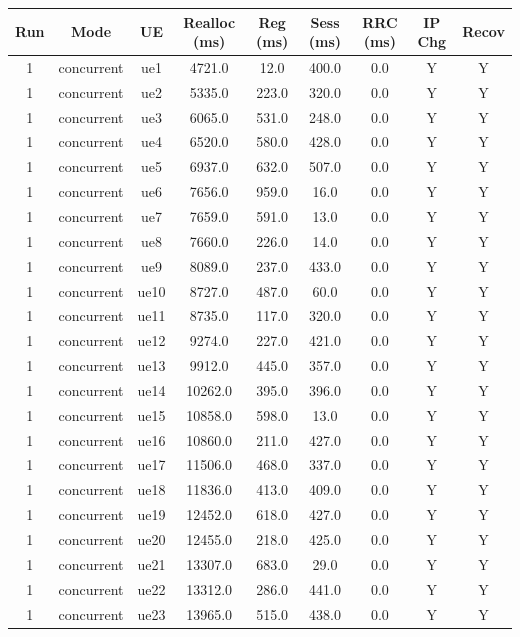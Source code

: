 \begin{table}[ht]
\centering
\begin{tabular}{|c|c|c|c|c|c|c|c|c|}
\hline
Run & Mode & UE & Realloc (ms) & Reg (ms) & Sess (ms) & RRC (ms) & IP Chg & Recov \\
\hline
1 & concurrent & ue1 & 4721.0 & 12.0 & 400.0 & 0.0 & Y & Y \\
1 & concurrent & ue2 & 5335.0 & 223.0 & 320.0 & 0.0 & Y & Y \\
1 & concurrent & ue3 & 6065.0 & 531.0 & 248.0 & 0.0 & Y & Y \\
1 & concurrent & ue4 & 6520.0 & 580.0 & 428.0 & 0.0 & Y & Y \\
1 & concurrent & ue5 & 6937.0 & 632.0 & 507.0 & 0.0 & Y & Y \\
1 & concurrent & ue6 & 7656.0 & 959.0 & 16.0 & 0.0 & Y & Y \\
1 & concurrent & ue7 & 7659.0 & 591.0 & 13.0 & 0.0 & Y & Y \\
1 & concurrent & ue8 & 7660.0 & 226.0 & 14.0 & 0.0 & Y & Y \\
1 & concurrent & ue9 & 8089.0 & 237.0 & 433.0 & 0.0 & Y & Y \\
1 & concurrent & ue10 & 8727.0 & 487.0 & 60.0 & 0.0 & Y & Y \\
1 & concurrent & ue11 & 8735.0 & 117.0 & 320.0 & 0.0 & Y & Y \\
1 & concurrent & ue12 & 9274.0 & 227.0 & 421.0 & 0.0 & Y & Y \\
1 & concurrent & ue13 & 9912.0 & 445.0 & 357.0 & 0.0 & Y & Y \\
1 & concurrent & ue14 & 10262.0 & 395.0 & 396.0 & 0.0 & Y & Y \\
1 & concurrent & ue15 & 10858.0 & 598.0 & 13.0 & 0.0 & Y & Y \\
1 & concurrent & ue16 & 10860.0 & 211.0 & 427.0 & 0.0 & Y & Y \\
1 & concurrent & ue17 & 11506.0 & 468.0 & 337.0 & 0.0 & Y & Y \\
1 & concurrent & ue18 & 11836.0 & 413.0 & 409.0 & 0.0 & Y & Y \\
1 & concurrent & ue19 & 12452.0 & 618.0 & 427.0 & 0.0 & Y & Y \\
1 & concurrent & ue20 & 12455.0 & 218.0 & 425.0 & 0.0 & Y & Y \\
1 & concurrent & ue21 & 13307.0 & 683.0 & 29.0 & 0.0 & Y & Y \\
1 & concurrent & ue22 & 13312.0 & 286.0 & 441.0 & 0.0 & Y & Y \\
1 & concurrent & ue23 & 13965.0 & 515.0 & 438.0 & 0.0 & Y & Y \\

\end{tabular}
\end{table}
